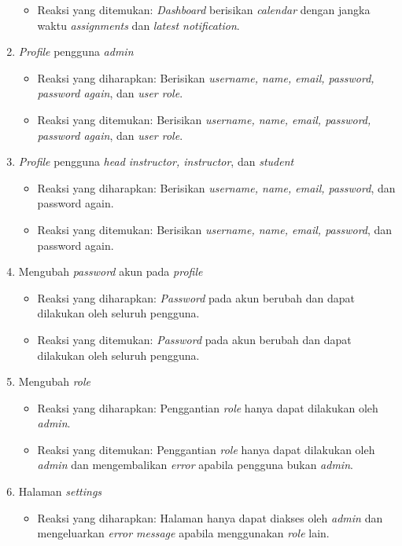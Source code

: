 \begin{enumerate}
\begin{itemize}
	 	\item Reaksi yang ditemukan: \textit{Dashboard} berisikan \textit{calendar} dengan jangka waktu \textit{assignments} dan \textit{latest notification}.
	 \end{itemize}
	 \item \textit{Profile} pengguna \textit{admin}
	 \begin{itemize}
	 	\item Reaksi yang diharapkan: Berisikan \textit{username, name, email, password, password again}, dan \textit{user role}.
	 	\item Reaksi yang ditemukan: Berisikan \textit{username, name, email, password, password again}, dan \textit{user role}.
	 \end{itemize}
	 \item \textit{Profile} pengguna \textit{head instructor, instructor}, dan \textit{student}
	 \begin{itemize}
	 	\item Reaksi yang diharapkan: Berisikan \textit{username, name, email, password}, dan password again.
	 	\item Reaksi yang ditemukan: Berisikan \textit{username, name, email, password}, dan password again.
	 \end{itemize}
	 \item Mengubah \textit{password} akun pada \textit{profile}
	 \begin{itemize}
	 	\item Reaksi yang diharapkan: \textit{Password} pada akun berubah dan dapat dilakukan oleh seluruh pengguna.
	 	\item Reaksi yang ditemukan: \textit{Password} pada akun berubah dan dapat dilakukan oleh seluruh pengguna.
	 \end{itemize}
	 \item Mengubah \textit{role}
	 \begin{itemize}
	 	\item Reaksi yang diharapkan: Penggantian \textit{role} hanya dapat dilakukan oleh \textit{admin}.
	 	\item Reaksi yang ditemukan: Penggantian \textit{role} hanya dapat dilakukan oleh \textit{admin} dan mengembalikan \textit{error} apabila pengguna bukan \textit{admin}.
	 \end{itemize}
	 \item Halaman \textit{settings}
	 \begin{itemize}
	 	\item Reaksi yang diharapkan: Halaman hanya dapat diakses oleh \textit{admin} dan mengeluarkan \textit{error message} apabila menggunakan \textit{role} lain.

\end{itemize}
\end{enumerate}
